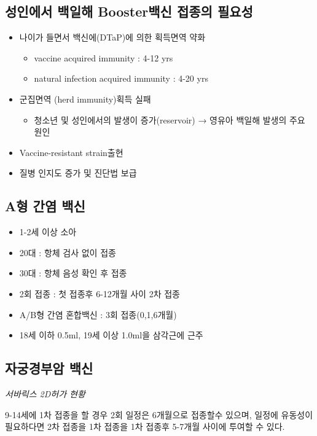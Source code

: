 \subsection{성인에서 백일해 Booster백신 접종의 필요성}
\begin{itemize}\tightlist
\item 나이가 들면서 백신에(DTaP)에 의한 획득면역 약화
	\begin{itemize}\tightlist
	\item vaccine acquired immunity : 4-12 yrs
	\item natural infection acquired immunity : 4-20 yrs
	\end{itemize}
\item 군집면역 (herd immunity)획득 실패
	\begin{itemize}\tightlist
	\item 청소년 및 성인에서의 발생이 증가(reservoir) → 영유아 백일해 발생의 주요 원인
	\end{itemize}
\item Vaccine-resistant strain출현
\item 질병 인지도 증가 및 진단법 보급
\end{itemize}

\subsection{A형 간염 백신}
\begin{itemize}\tightlist
\item 1-2세 이상 소아
\item 20대 : 항체 검사 없이 접종
\item 30대 : 항체 음성 확인 후 접종
\item 2회 접종 : 첫 접종후 6-12개월 사이 2차 접종
\item A/B형 간염 혼합백신 : 3회 접종(0,1,6개월)
\item 18세 이하 0.5ml, 19세 이상 1.0ml을 삼각근에 근주
\end{itemize}

\subsection{자궁경부암 백신}
\emph{서바릭스 2D허가 현황}\par
9-14세에 1차 접종을 할 경우 2회 일정은 6개월으로 접종할수 있으며, 일정에 유동성이 필요하다면 2차 접종을 1차 접종을 1차 접종후 5-7개월 사이에 투여할 수 있다.
